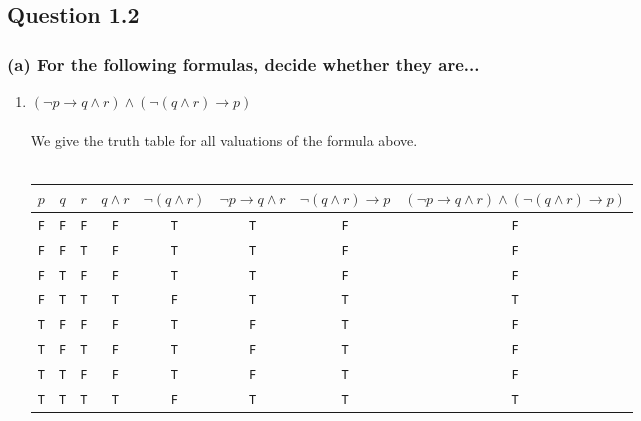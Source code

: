 \documentclass[10pt,a4paper]{article}
\let\imp\to
\begin{document}
\newpage
\subsection*{Question 1.2}
\subsubsection*{(a) \mdseries For the following formulas, decide whether they are...}
\begin{enumerate}[i]
	\item
	{
	$(\neg p \imp q \land r) \land (\neg (q \land r) \imp p)$ \\\\
	We give the truth table for all valuations of the formula above. \\\\
	\begin{tabular}{ccccccc|c}
		$p$ & $q$ & $r$ &
		$q \land r$ &
		$\neg (q \land r)$ &
		$\neg p \imp q \land r$ &
		$\neg (q \land r) \imp p$ &
		$(\neg p \imp q \land r) \land (\neg (q \land r) \imp p)$ \\ \hline
		{\tt F} & {\tt F} & {\tt F} & {\tt F} & {\tt T} & {\tt T} & {\tt F} & {\tt F} \\
		{\tt F} & {\tt F} & {\tt T} & {\tt F} & {\tt T} & {\tt T} & {\tt F} & {\tt F} \\
		{\tt F} & {\tt T} & {\tt F} & {\tt F} & {\tt T} & {\tt T} & {\tt F} & {\tt F} \\
		{\tt F} & {\tt T} & {\tt T} & {\tt T} & {\tt F} & {\tt T} & {\tt T} & {\tt T} \\
		{\tt T} & {\tt F} & {\tt F} & {\tt F} & {\tt T} & {\tt F} & {\tt T} & {\tt F} \\
		{\tt T} & {\tt F} & {\tt T} & {\tt F} & {\tt T} & {\tt F} & {\tt T} & {\tt F} \\
		{\tt T} & {\tt T} & {\tt F} & {\tt F} & {\tt T} & {\tt F} & {\tt T} & {\tt F} \\
		{\tt T} & {\tt T} & {\tt T} & {\tt T} & {\tt F} & {\tt T} & {\tt T} & {\tt T} \\
	\end{tabular}
	
	}
	

\end{enumerate}
\end{document}
